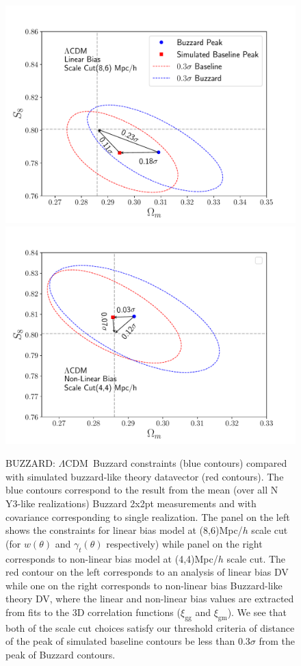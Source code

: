 \documentclass[fleqn,usenatbib]{mnras}
\newcommand{\gammat}{\ensuremath{\gamma_{t}(\theta)}}
\newcommand{\wtheta}{\ensuremath{w(\theta)}}
\newcommand{\xigg}{\ensuremath{\xi_{\mathrm{gg}}} }
\newcommand{\xigm}{\ensuremath{\xi_{\mathrm{gm}}} }
\newcommand{\lcdm}{$\Lambda$CDM}
\begin{document}
\begin{figure}
\includegraphics[width=\columnwidth]{figs/linear_bias_86_lcdm_Om_S8_buzzard.pdf}
\includegraphics[width=\columnwidth]{figs/non_linear_bias_44_lcdm_Om_S8_buzzard.pdf}
\caption[]{BUZZARD: \lcdm\ Buzzard constraints (blue contours) compared with simulated buzzard-like theory datavector (red contours). The blue contours correspond to the result from the mean (over all N Y3-like realizations) Buzzard 2x2pt measurements and with covariance corresponding to single realization. The panel on the left shows the constraints for linear bias model at (8,6)Mpc/$h$ scale cut (for $\wtheta$ and $\gammat$ respectively) while panel on the right corresponds to non-linear bias model at (4,4)Mpc/$h$ scale cut. The red contour on the left corresponds to an analysis of linear bias DV while one on the right corresponds to non-linear bias Buzzard-like theory DV, where the linear and non-linear bias values are extracted from fits to the 3D correlation functions ($\xigg$ and $\xigm$). We see that both of the scale cut choices satisfy our threshold criteria of distance of the peak of simulated baseline contours be less than 0.3$\sigma$ from the peak of Buzzard contours. }
\label{fig:bcc_des_lcdm}
\end{figure}
\end{document}
